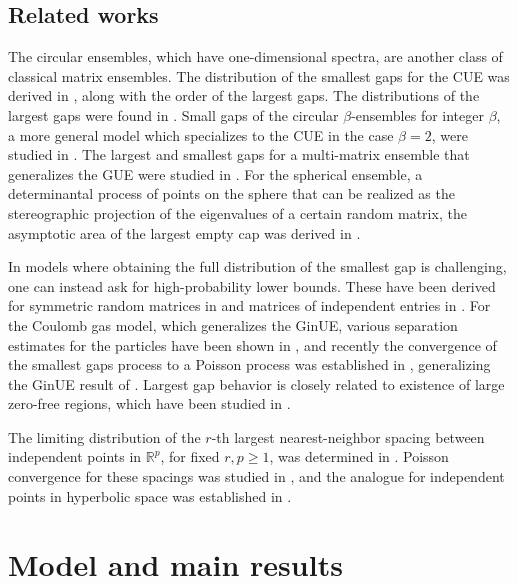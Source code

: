 \documentclass{amsart}
\theoremstyle{plain}
\theoremstyle{definition}
\theoremstyle{remark}
\begin{document}
\subsection{Related works} The circular ensembles, which have one-dimensional spectra, are another class of classical matrix ensembles. The distribution of the smallest gaps for the CUE was derived in \cite{ben2013extreme}, along with the order of the largest gaps. The distributions of the largest gaps were found in \cite{feng2018large}. Small gaps of the circular $\beta$-ensembles for integer $\beta$, a more general model which specializes to the CUE in the case $\beta=2$, were studied in \cite{feng2021small}. The largest and smallest gaps for a multi-matrix ensemble that generalizes the GUE were studied in \cite{figalli2016universality}. For the spherical ensemble, a determinantal process of points on the sphere that can be realized as the stereographic projection of the eigenvalues of a certain random matrix, the asymptotic area of the largest empty cap was derived in \cite{alishahi2015spherical}.

In models where obtaining the full distribution of the smallest gap is challenging, one can instead ask for high-probability lower bounds. These have been derived for symmetric random matrices in 
\cite{nguyen2017random,lopatto2021tail} and matrices of independent entries in \cite{Ge2017EigenvalSpacing,Luh2021Eigenvectors}.
For the Coulomb gas model, which generalizes the GinUE, various separation estimates for the particles have been shown in \cite{ameur2018repulsion,ameur2023planar,thoma2022overcrowding, Ameur2024HeleShaw}, and recently the convergence of the smallest gaps process to a Poisson process was established in \cite{charlier2025smallest}, generalizing the GinUE result of \cite{shi2012smallest}. Largest gap behavior is closely related to existence of large zero-free regions, which have been studied in \cite{Charlier2024Annuli, adhikari2017hole, adhikari2018hole,charlier2023hole}. 

The limiting distribution of the $r$-th largest nearest-neighbor spacing between independent points in $\mathbb{R}^p$, for fixed $r, p \ge 1$, was determined in \cite{henze1982limit,henze1983asymptotischer}. Poisson convergence for these spacings was studied in \cite{cho,BSY21}, and the analogue for independent points in hyperbolic space was established in  \cite{otto2023large}. 



\section{Model and main results} \label{sec:model}
\end{document}

